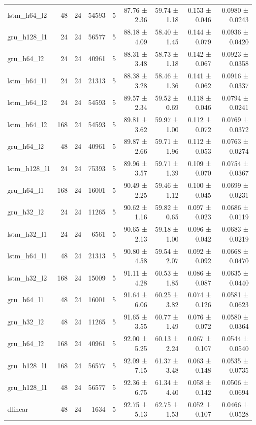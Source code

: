 \begin{table}[htbp]
\begin{tabular}{lrrrrrrrr}
lstm\_h64\_l2 & 48 & 24 & 54593 & 5 & 87.76 ± 2.36 & 59.74 ± 1.18 & 0.153 ± 0.046 & 0.0980 ± 0.0243 \\
gru\_h128\_l1 & 24 & 24 & 56577 & 5 & 88.18 ± 4.09 & 58.40 ± 1.45 & 0.144 ± 0.079 & 0.0936 ± 0.0420 \\
gru\_h64\_l2 & 24 & 24 & 40961 & 5 & 88.31 ± 3.48 & 58.73 ± 1.18 & 0.142 ± 0.067 & 0.0923 ± 0.0358 \\
lstm\_h64\_l1 & 24 & 24 & 21313 & 5 & 88.38 ± 3.28 & 58.46 ± 1.36 & 0.141 ± 0.062 & 0.0916 ± 0.0337 \\
lstm\_h64\_l2 & 24 & 24 & 54593 & 5 & 89.57 ± 2.34 & 59.52 ± 0.69 & 0.118 ± 0.046 & 0.0794 ± 0.0241 \\
lstm\_h64\_l2 & 168 & 24 & 54593 & 5 & 89.81 ± 3.62 & 59.97 ± 1.00 & 0.112 ± 0.072 & 0.0769 ± 0.0372 \\
gru\_h64\_l2 & 48 & 24 & 40961 & 5 & 89.87 ± 2.66 & 59.71 ± 1.96 & 0.112 ± 0.053 & 0.0763 ± 0.0274 \\
lstm\_h128\_l1 & 24 & 24 & 75393 & 5 & 89.96 ± 3.57 & 59.71 ± 1.39 & 0.109 ± 0.070 & 0.0754 ± 0.0367 \\
gru\_h64\_l1 & 168 & 24 & 16001 & 5 & 90.49 ± 2.25 & 59.46 ± 1.12 & 0.100 ± 0.045 & 0.0699 ± 0.0231 \\
gru\_h32\_l2 & 24 & 24 & 11265 & 5 & 90.62 ± 1.16 & 59.82 ± 0.65 & 0.097 ± 0.023 & 0.0686 ± 0.0119 \\
lstm\_h32\_l1 & 24 & 24 & 6561 & 5 & 90.65 ± 2.13 & 59.18 ± 1.00 & 0.096 ± 0.042 & 0.0683 ± 0.0219 \\
lstm\_h64\_l1 & 48 & 24 & 21313 & 5 & 90.80 ± 4.58 & 59.54 ± 2.07 & 0.092 ± 0.092 & 0.0668 ± 0.0470 \\
lstm\_h32\_l2 & 168 & 24 & 15009 & 5 & 91.11 ± 4.28 & 60.53 ± 1.85 & 0.086 ± 0.087 & 0.0635 ± 0.0440 \\
gru\_h64\_l1 & 48 & 24 & 16001 & 5 & 91.64 ± 6.06 & 60.25 ± 3.82 & 0.074 ± 0.126 & 0.0581 ± 0.0623 \\
gru\_h32\_l2 & 48 & 24 & 11265 & 5 & 91.65 ± 3.55 & 60.77 ± 1.49 & 0.076 ± 0.072 & 0.0580 ± 0.0364 \\
gru\_h64\_l2 & 168 & 24 & 40961 & 5 & 92.00 ± 5.25 & 60.13 ± 2.24 & 0.067 ± 0.107 & 0.0544 ± 0.0540 \\
gru\_h128\_l1 & 168 & 24 & 56577 & 5 & 92.09 ± 7.15 & 61.37 ± 3.48 & 0.063 ± 0.148 & 0.0535 ± 0.0735 \\
gru\_h128\_l1 & 48 & 24 & 56577 & 5 & 92.36 ± 6.75 & 61.34 ± 4.40 & 0.058 ± 0.142 & 0.0506 ± 0.0694 \\
dlinear & 48 & 24 & 1634 & 5 & 92.75 ± 5.13 & 62.75 ± 1.53 & 0.052 ± 0.107 & 0.0466 ± 0.0528 \\

\end{tabular}
\end{table}
